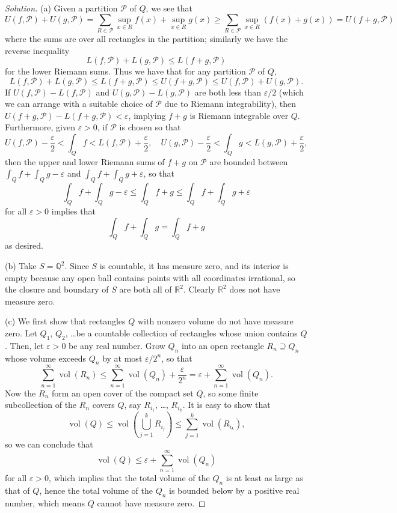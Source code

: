 \documentclass[10pt]{scrartcl}
\providecommand{\eps}{\varepsilon}
\providecommand{\QQ}{\mathbb Q}
\providecommand{\RR}{\mathbb R}
\newenvironment{soln}{\begin{proof}[Solution]}{\end{proof}}
\begin{document}
\begin{soln}
	(a) Given a partition $\mathcal P$ of $Q$, we see that
	\[U(f,\mathcal P)+U(g,\mathcal P)
	= \sum_{R\in\mathcal P} \sup_{x\in R}f(x) + \sup_{x\in R}g(x)
	\ge \sum_{R\in\mathcal P} \sup_{x\in R}(f(x)+g(x)) = U(f+g,\mathcal P)\]
	where the sums are over all rectangles in the partition; similarly
	we have the reverse inequality
	\[L(f,\mathcal P)+L(g,\mathcal P)\le L(f+g,\mathcal P)\]
	for the lower Riemann sums.
	Thus we have that for any partition $\mathcal P$ of $Q$,
	\[L(f,\mathcal P)+L(g,\mathcal P)
	\le L(f+g,\mathcal P)\le U(f+g,\mathcal P)
	\le U(f,\mathcal P)+U(g,\mathcal P).\]
	If $U(f,\mathcal P)-L(f,\mathcal P)$ and $U(g,\mathcal P)-L(g,\mathcal P)$
	are both less than $\eps/2$ (which we can arrange with a suitable
	choice of $\mathcal P$ due to Riemann integrability),
	then $U(f+g,\mathcal P)-L(f+g,\mathcal P)<\eps$,
	implying $f+g$ is Riemann integrable over $Q$.
	Furthermore, given $\eps>0$, if $\mathcal P$ is chosen so that
	\[U(f,\mathcal P)-\frac\eps2 < \int_Qf < L(f,\mathcal P)+\frac\eps2,\quad
	U(g,\mathcal P)-\frac\eps2 < \int_Qg < L(g,\mathcal P)+\frac\eps2,\]
	then the upper and lower Riemann sums of $f+g$ on $\mathcal P$
	are bounded between $\int_Qf+\int_Qg-\eps$ and $\int_Qf+\int_Qg+\eps$,
	so that
	\[\int_Qf+\int_Qg-\eps\le \int_Qf+g\le\int_Qf+\int_Qg+\eps\]
	for all $\eps>0$ implies that
	\[\int_Qf+\int_Qg = \int_Qf+g\]
	as desired.
	
	(b) Take $S = \QQ^2$. Since $S$ is countable, it has measure zero,
	and its interior is empty because any open ball contains points
	with all coordinates irrational, so the closure and boundary of $S$
	are both all of $\RR^2$. Clearly $\RR^2$ does not have measure zero.
	
	(c) We first show that rectangles $Q$ with nonzero volume
	do not have measure zero. Let $Q_1$, $Q_2$, \dots be
	a countable collection of rectangles whose union contains $Q$.
	Then, let $\eps > 0$ be any real number. Grow $Q_n$ into
	an open rectangle $R_n\supseteq Q_n$ whose volume exceeds $Q_n$
	by at most $\eps/2^n$, so that
	\[\sum_{n=1}^\infty\operatorname{vol}(R_n)
	\le \sum_{n=1}^\infty \operatorname{vol}(Q_n) + \frac{\eps}{2^n}
	= \eps + \sum_{n=1}^\infty \operatorname{vol}(Q_n).\]
	Now the $R_n$ form an open cover of the compact set $Q$,
	so some finite subcollection of the $R_n$ covers $Q$,
	say $R_{i_1}$, \dots, $R_{i_k}$. It is easy to show that
	\[\operatorname{vol}(Q)\le
	\operatorname{vol}\left(\bigcup_{j=1}^k R_{i_j}\right)
	\le \sum_{j=1}^k \operatorname{vol}(R_{i_k}),\]
	so we can conclude that
	\[\operatorname{vol}(Q)\le \eps+\sum_{n=1}^\infty\operatorname{vol}(Q_n)\]
	for all $\eps>0$, which implies that the total volume of the $Q_n$
	is at least as large as that of $Q$, hence the total volume of the $Q_n$
	is bounded below by a positive real number, which means $Q$
	cannot have measure zero.
	

\end{soln}
\end{document}
